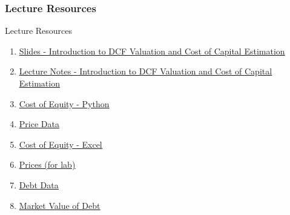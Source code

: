 \documentclass[handout, 11pt]{beamer}
\begin{document}
\begin{frame}
\frametitle{Lecture Resources}
{
\begin{block}{Lecture Resources}
\begin{enumerate}
\item \textcolor{blue}{\underline{\href{https://nickderobertis.github.io/fin-model-course/\_static/generated/pdfs/S11 Introduction to DCF Valuation and Cost of Capital Estimation.pdf}{Slides - Introduction to DCF Valuation and Cost of Capital Estimation}}}
\item \textcolor{blue}{\underline{\href{https://nickderobertis.github.io/fin-model-course/\_static/generated/pdfs/LN11 Introduction to DCF Valuation and Cost of Capital Estimation.pdf}{Lecture Notes - Introduction to DCF Valuation and Cost of Capital Estimation}}}
\item \textcolor{blue}{\underline{\href{https://nickderobertis.github.io/fin-model-course/\_static/Examples/DCF/Cost of Equity/Determining the Cost of Equity.ipynb}{Cost of Equity - Python}}}
\item \textcolor{blue}{\underline{\href{https://nickderobertis.github.io/fin-model-course/\_static/Examples/DCF/Cost of Equity/price data.xlsx}{Price Data}}}
\item \textcolor{blue}{\underline{\href{https://nickderobertis.github.io/fin-model-course/\_static/Examples/DCF/Cost of Equity/DCF Cost of Equity.xlsx}{Cost of Equity - Excel}}}
\item \textcolor{blue}{\underline{\href{https://nickderobertis.github.io/fin-model-course/\_static/Materials for Lab Exercises/DCF/Cost of Equity/prices.xlsx}{Prices (for lab)}}}
\item \textcolor{blue}{\underline{\href{https://nickderobertis.github.io/fin-model-course/\_static/Examples/DCF/Cost of Debt/debt data.xlsx}{Debt Data}}}
\item \textcolor{blue}{\underline{\href{https://nickderobertis.github.io/fin-model-course/\_static/Examples/DCF/Cost of Debt/Market Value of Debt.ipynb}{Market Value of Debt}}}
\end{enumerate}
\vfill
\end{block}
}
\label{frames:resources}
\end{frame}
\small
\end{document}
